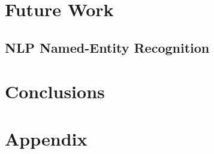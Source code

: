 \documentclass{article}
\numberwithin{equation}{section}
\begin{document}
\section{Future Work}
\subsection{NLP Named-Entity Recognition}

\newpage
\section{Conclusions}

\newpage



\newpage
\appendix
\section{Appendix}
\end{document}
